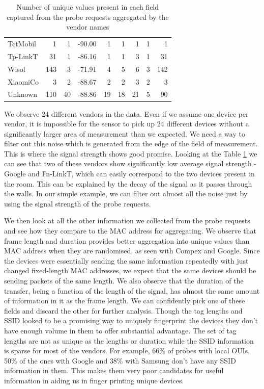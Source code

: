 \begin{table}
\begin{center}
\begin{tabular}{lrrrrrrrr}
  TctMobil &    1 &   1 & -90.00 &   1 &   1 &   1 &   1 &   1 \\ 
  Tp-LinkT &   31 &   1 & -86.16 &   1 &   1 &   3 &   1 &  31 \\ 
  Wisol    &  143 &   3 & -71.91 &   4 &   5 &   6 &   3 & 142 \\ 
  XiaomiCo &    3 &   2 & -88.67 &   2 &   2 &   3 &   2 &   3 \\ 
  Unknown  &  110 &  40 & -88.86 &  19 &  18 &  21 &   5 &  90 \\ 
  \bottomrule
  \end{tabular}
\end{center}
\caption{Number of unique values present in each field captured from the probe requests aggregated by the vendor names}
\label{table:collection:proberequests}
\end{table}

We observe 24 different vendors in the data. Even if we assume one device per vendor, it is impossible for the sensor to pick up 24 different devices without a significantly larger area of measurement than we expected.
We need a way to filter out this noise which is generated from the edge of the field of measurement.
This is where the signal strength shows good promise.
Looking at the Table \ref{table:collection:proberequests} we can see that two of these vendors show significantly low average signal strength - Google and Fn-LinkT, which can easily correspond to the two devices present in the room.
This can be explained by the decay of the signal as it passes through the walls.
In our simple example, we can filter out almost all the noise just by using the signal strength of the probe requests.

We then look at all the other information we collected from the probe requests and see how they compare to the MAC address for aggregating.
We observe that frame length and duration provides better aggregation into unique values than MAC address when they are randomised, as seen with Compex and Google.
Since the devices were essentially sending the same information repeatedly with just changed fixed-length MAC addresses, we expect that the same devices should be sending packets of the same length.
We also observe that the duration of the transfer, being a function of the length of the signal, has almost the same amount of information in it as the frame length.
We can confidently pick one of these fields and discard the other for further analysis.
Though the tag lengths and SSID looked to be a promising way to uniquely fingerprint the devices they don't have enough volume in them to offer substantial advantage.
The set of tag lengths are not as unique as the lengths or duration while the SSID information is sparse for most of the vendors.
For example, 66\% of probes with local OUIs, 50\% of the ones with Google and 38\% with Samsung don't have any SSID information in them.
This makes them very poor candidates for useful information in aiding us in finger printing unique devices.

